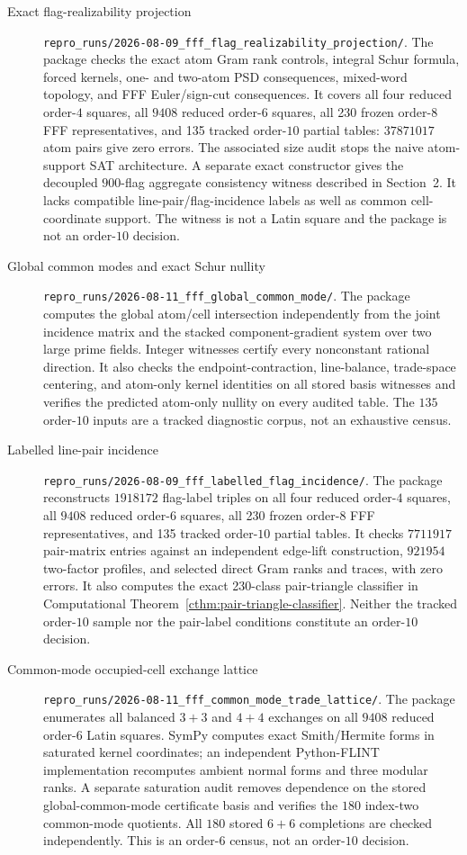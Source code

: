 \begin{description}
\item[Exact flag-realizability projection]
\nolinkurl{repro_runs/2026-08-09_fff_flag_realizability_projection/}.
The package checks the exact atom Gram rank controls, integral Schur formula,
forced kernels, one- and two-atom PSD consequences, mixed-word topology, and
FFF Euler/sign-cut consequences.  It covers all four reduced order-$4$
squares, all $9408$ reduced order-$6$ squares, all 230 frozen order-$8$ FFF
representatives, and 135 tracked order-$10$ partial tables: $37871017$ atom
pairs give zero errors.  The associated size audit stops the naive
atom-support SAT architecture.  A separate exact constructor gives the
decoupled $900$-flag aggregate consistency witness described in Section~2.
It lacks compatible line-pair/flag-incidence labels as well as common
cell-coordinate support.  The witness is not a Latin square and the package
is not an order-$10$ decision.

\item[Global common modes and exact Schur nullity]
\nolinkurl{repro_runs/2026-08-11_fff_global_common_mode/}.
The package computes the global atom/cell intersection independently from
the joint incidence matrix and the stacked component-gradient system over
two large prime fields.  Integer witnesses certify every nonconstant
rational direction.  It also checks the endpoint-contraction, line-balance,
trade-space centering, and atom-only kernel identities on all stored basis
witnesses and verifies the predicted atom-only nullity on every audited
table.  The $135$ order-$10$ inputs are a tracked diagnostic corpus, not an
exhaustive census.

\item[Labelled line-pair incidence]
\nolinkurl{repro_runs/2026-08-09_fff_labelled_flag_incidence/}.
The package reconstructs $1918172$ flag-label triples on all four reduced
order-$4$ squares, all $9408$ reduced order-$6$ squares, all 230 frozen
order-$8$ FFF representatives, and 135 tracked order-$10$ partial tables.
It checks $7711917$ pair-matrix entries against an independent edge-lift
construction, $921954$ two-factor profiles, and selected direct Gram ranks
and traces, with zero errors.  It also computes the exact 230-class
pair-triangle classifier in Computational
Theorem~\ref{cthm:pair-triangle-classifier}.  Neither the tracked order-$10$
sample nor the pair-label conditions constitute an order-$10$ decision.

\item[Common-mode occupied-cell exchange lattice]
\nolinkurl{repro_runs/2026-08-11_fff_common_mode_trade_lattice/}.
The package enumerates all balanced $3+3$ and $4+4$ exchanges on all $9408$
reduced order-$6$ Latin squares.  SymPy computes exact Smith/Hermite forms in
saturated kernel coordinates; an independent Python-FLINT implementation
recomputes ambient normal forms and three modular ranks.  A separate
saturation audit removes dependence on the stored global-common-mode
certificate basis and
verifies the $180$ index-two common-mode quotients.  All $180$ stored
$6+6$ completions are checked independently.  This is an order-$6$ census,
not an order-$10$ decision.


\end{description}
